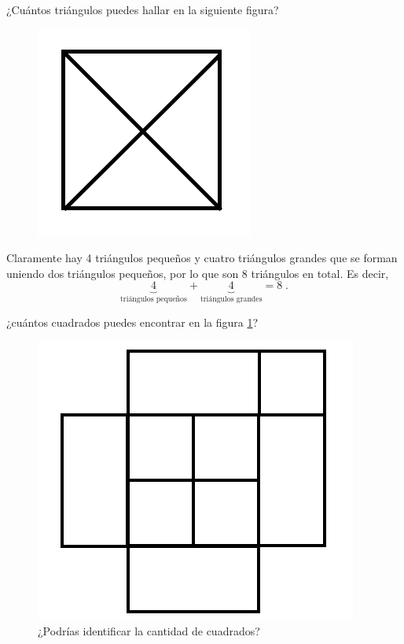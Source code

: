 \documentclass[12pt]{article}
\begin{document}
\begin{ejemplo}
¿Cuántos triángulos puedes hallar en la siguiente figura?
\begin{figure}[h]
    \centering
    \includegraphics[scale=0.5]{Imagenes/IMG1/square.png}
\end{figure}
\end{ejemplo}
\begin{solucion}
Claramente hay 4 triángulos pequeños y cuatro triángulos grandes que se forman uniendo dos triángulos pequeños, por lo que son 8 triángulos en total. Es decir,
\[\underbrace{4}_{\text{triángulos pequeños}}+\underbrace{4}_{\text{triángulos grandes}}=8\;.\]
\end{solucion}

\begin{ejemplo}
¿cuántos cuadrados puedes encontrar en la figura \ref{cuadrado}?
\begin{figure}[h]
    \centering
    \includegraphics[scale=0.5]{Imagenes/IMG1/fig.png}
    \caption{¿Podrías identificar la cantidad de cuadrados?}
    \label{cuadrado}
\end{figure}
\end{ejemplo}
\end{document}
